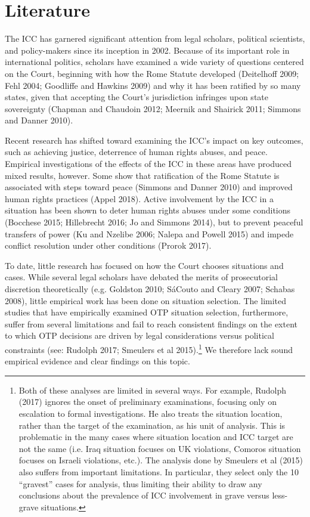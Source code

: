 \section*{Literature}

The ICC has garnered significant attention from legal scholars, political scientists, and policy-makers since its inception in 2002. Because of its important role in international politics, scholars have examined a wide variety of questions centered on the Court, beginning with how the Rome Statute developed (Deitelhoff 2009; Fehl 2004; Goodliffe and Hawkins 2009) and why it has been ratified by so many states, given that accepting the Court's jurisdiction infringes upon state sovereignty (Chapman and Chaudoin 2012; Meernik and Shairick 2011; Simmons and Danner 2010).

Recent research has shifted toward examining the ICC's impact on key outcomes, such as achieving justice, deterrence of human rights abuses, and peace. Empirical investigations of the effects of the ICC in these areas have produced mixed results, however. Some show that ratification of the Rome Statute is associated with steps toward peace (Simmons and Danner 2010) and improved human rights practices (Appel 2018). Active involvement by the ICC in a situation has been shown to deter human rights abuses under some conditions (Bocchese 2015; Hillebrecht 2016; Jo and Simmons 2014), but to prevent peaceful transfers of power (Ku and Nzelibe 2006; Nalepa and Powell 2015) and impede conflict resolution under other conditions (Prorok 2017).

To date, little research has focused on how the Court chooses situations and cases. While several legal scholars have debated the merits of prosecutorial discretion theoretically (e.g. Goldston 2010; SáCouto and Cleary 2007; Schabas 2008), little empirical work has been done on situation selection. The limited studies that have empirically examined OTP situation selection, furthermore, suffer from several limitations and fail to reach consistent findings on the extent to which OTP decisions are driven by legal considerations versus political constraints (see: Rudolph 2017; Smeulers et al 2015).\footnote{Both of these analyses are limited in several ways. For example, Rudolph (2017) ignores the onset of preliminary examinations, focusing only on escalation to formal investigations. He also treats the situation location, rather than the target of the examination, as his unit of analysis. This is problematic in the many cases where situation location and ICC target are not the same (i.e. Iraq situation focuses on UK violations, Comoros situation focuses on Israeli violations, etc.). The analysis done by Smeulers et al (2015) also suffers from important limitations. In particular, they select only the 10 ``gravest'' cases for analysis, thus limiting their ability to draw any conclusions about the prevalence of ICC involvement in grave versus less-grave situations.} We therefore lack sound empirical evidence and clear findings on this topic.

